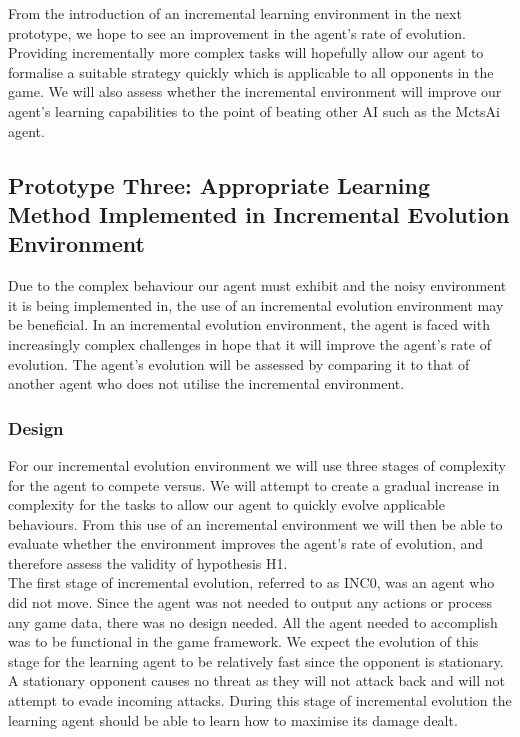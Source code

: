 \documentclass[12pt,a4paper]{article}
\begin{document}
From the introduction of an incremental learning environment in the next prototype, we hope to see an improvement in the agent's rate of evolution. Providing incrementally more complex tasks will hopefully allow our agent to formalise a suitable strategy quickly which is applicable to all opponents in the game. We will also assess whether the incremental environment will improve our agent's learning capabilities to the point of beating other AI such as the MctsAi agent.\\


\newpage
\subsection{Prototype Three: Appropriate Learning Method Implemented in Incremental Evolution Environment}
Due to the complex behaviour our agent must exhibit and the noisy environment it is being implemented in, the use of an incremental evolution environment may be beneficial. In an incremental evolution environment, the agent is faced with increasingly complex challenges in hope that it will improve the agent's rate of evolution. The agent's evolution will be assessed by comparing it to that of another agent who does not utilise the incremental environment.\\
\newpage
\subsubsection{Design}
For our incremental evolution environment we will use three stages of complexity for the agent to compete versus. We will attempt to create a gradual increase in complexity for the tasks to allow our agent to quickly evolve applicable behaviours. From this use of an incremental environment we will then be able to evaluate whether the environment improves the agent's rate of evolution, and therefore assess the validity of hypothesis H1.\\

The first stage of incremental evolution, referred to as INC0, was an agent who did not move. Since the agent was not needed to output any actions or process any game data, there was no design needed. All the agent needed to accomplish was to be functional in the game framework. We expect the evolution of this stage for the learning agent to be relatively fast since the opponent is stationary. A stationary opponent causes no threat as they will not attack back and will not attempt to evade incoming attacks. During this stage of incremental evolution the learning agent should be able to learn how to maximise its damage dealt.\\
\end{document}
